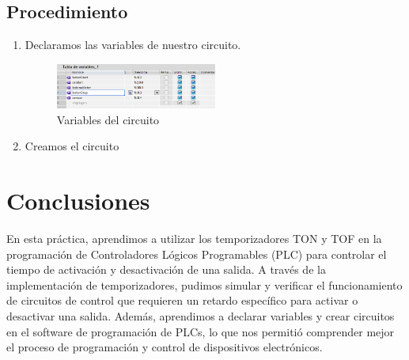 \documentclass[12pt]{report}
\begin{document}
\section{Procedimiento}
\begin{enumerate}
  \item Declaramos las variables de nuestro circuito.
        \begin{figure}[H]
          \centering
          \includegraphics[width=0.5\textwidth]{screenshots/variables.png}
          \caption{Variables del circuito}
          \label{fig:variables}
        \end{figure}
  \item Creamos el circuito

\end{enumerate}
\newpage

\newpage

\chapter{Conclusiones}
En esta práctica, aprendimos a utilizar los temporizadores TON y TOF en la programación de Controladores Lógicos Programables (PLC) para controlar el tiempo de activación y desactivación de una salida. A través de la implementación de temporizadores, pudimos simular y verificar el funcionamiento de circuitos de control que requieren un retardo específico para activar o desactivar una salida. Además, aprendimos a declarar variables y crear circuitos en el software de programación de PLCs, lo que nos permitió comprender mejor el proceso de programación y control de dispositivos electrónicos.
\newpage
\end{document}
